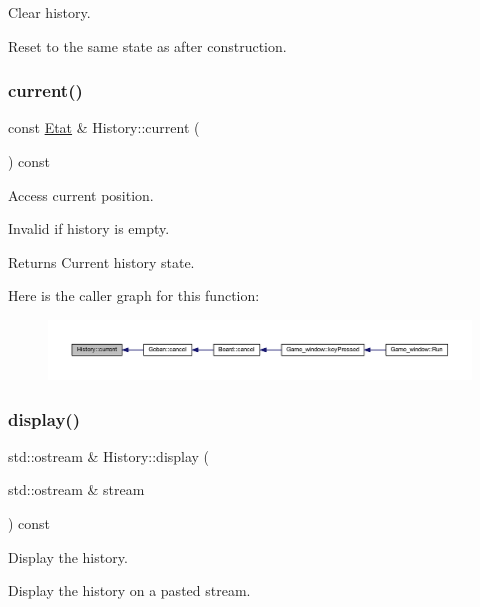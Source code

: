 Clear history. 

Reset to the same state as after construction. \mbox{\label{class_history_a0ca66ba5a026689877e027754fc5bd52}} 
\subsubsection{\texorpdfstring{current()}{current()}}
{\footnotesize\ttfamily const \hyperlink{class_etat}{Etat} \& History\+::current (\begin{DoxyParamCaption}{ }\end{DoxyParamCaption}) const}



Access current position. 

Invalid if history is empty.

\begin{DoxyReturn}{Returns}
Current history state. 
\end{DoxyReturn}
Here is the caller graph for this function\+:\nopagebreak
\begin{figure}[H]
\begin{center}
\leavevmode
\includegraphics[width=350pt]{class_history_a0ca66ba5a026689877e027754fc5bd52_icgraph}
\end{center}
\end{figure}
\mbox{\label{class_history_a5c1724d84912d1571d2475b2fb703081}} 
\subsubsection{\texorpdfstring{display()}{display()}}
{\footnotesize\ttfamily std\+::ostream \& History\+::display (\begin{DoxyParamCaption}\item[{std\+::ostream \&}]{stream }\end{DoxyParamCaption}) const}



Display the history. 

Display the history on a pasted stream.


